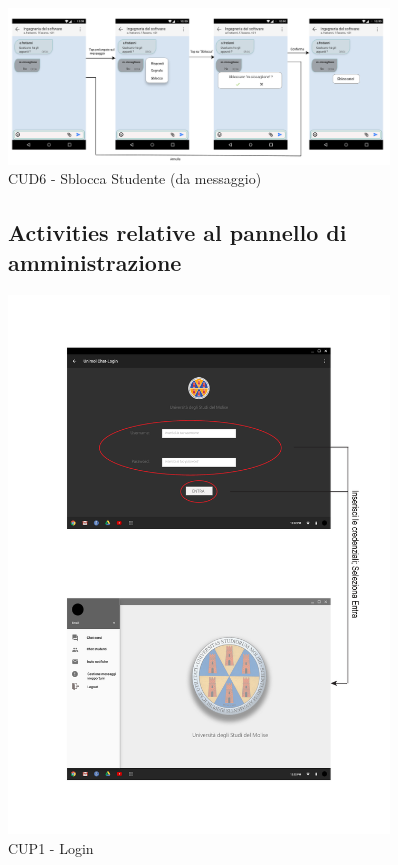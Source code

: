 \begin{figure}
	\centering
	\includegraphics[width=0.9\textwidth]{imgs/gruppo6/activities/act_cud6_sblocca_da_messaggio.pdf}
	\caption{CUD6 - Sblocca Studente (da messaggio)}
	\label{fig:cud6}
\end{figure}

\pagebreak
\begin{figure}
\subsection{Activities relative al pannello di amministrazione}
	\centering
	\includegraphics[width=0.9\textwidth]{imgs/gruppo6/activities/act_cup1_login.pdf}
	\caption{CUP1 - Login}
	\label{fig:cup1}
\end{figure}

